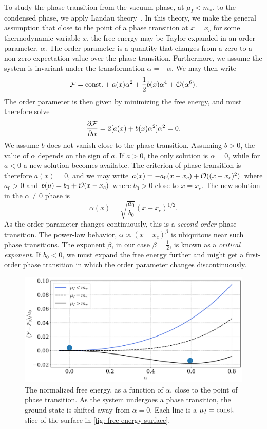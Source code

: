 To study the phase transition from the vacuum phase, at $\mu_I < m_{\pi}$, to the condensed phase, we apply Landau theory~\autocite{peskinIntroductionQuantumField1995}.
In this theory, we make the general assumption that close to the point of a phase transition at $x = x_c$ for some thermodynamic variable $x$, the free energy may be Taylor-expanded in an order parameter, $\alpha$.
The order parameter is a quantity that changes from a zero to a non-zero expectation value over the phase transition.
Furthermore, we assume the system is invariant under the transformation $\alpha = -\alpha$.
We may then write
%
\begin{equation}
    \mathcal{F} = \mathrm{const.} + a(x)\alpha^2 + \frac{1}{2} b(x)\alpha^4 + \mathcal O(\alpha^6).
\end{equation}
%
The order parameter is then given by minimizing the free energy, and must therefore solve
%
\begin{equation}
    \pdv{\mathcal{F}}{\alpha} = 2[a(x) + b(x) \alpha^2]\alpha^2 = 0.
\end{equation}
%
We assume $b$ does not vanish close to the phase transition.
Assuming $b > 0$, the value of $\alpha$ depends on the sign of $a$.
If $a>0$, the only solution is $\alpha = 0$, while for $a<0$ a new solution becomes available.
The criterion of phase transition is therefore $a(x) = 0$, and we may write $a(x) = -a_0(x - x_c) + \mathcal O((x - x_c)^2)$ where $a_0 > 0$ and $b(\mu) = b_0 + \mathcal O(x - x_c)$ where $b_0>0$ close to $x = x_c$. 
The new solution in the $\alpha \neq 0$ phase is
%
\begin{equation}
    \alpha(x) = \sqrt{\frac{a_0}{b_0}}(x - x_c)^{1/2}.
\end{equation}
%
As the order parameter changes continuously, this is a \emph{second-order} phase transition.
The power-law behavior, $\alpha \propto (x - x_c)^\beta$ is ubiquitous near such phase transitions.
The exponent $\beta$, in our case $\beta = \frac{1}{2}$, is known as a \emph{critical exponent}.
If $b_0<0$, we must expand the free energy further and might get a first-order phase transition in which the order parameter changes discontinuously.

\begin{figure}[!htb]
    \centering
    \includegraphics[width=.8\textwidth]{../scripts/figurer/phase_transition.pdf}
    \caption{
        The normalized free energy, as a function of $\alpha$, close to the point of phase transition. 
        As the system undergoes a phase transition, the ground state is shifted away from $\alpha = 0$.
        Each line is a $\mu_I=\mathrm{const.}$ slice of the surface in \autoref{fig: free energy surface}.
        }
    \label{fig: phase transition}
\end{figure}


